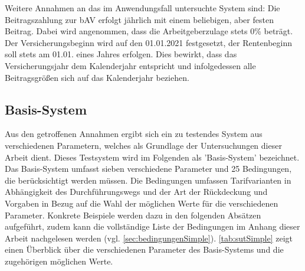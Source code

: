 Weitere Annahmen an das im Anwendungsfall untersuchte System sind: Die Beitragszahlung zur bAV erfolgt jährlich mit einem beliebigen, aber festen Beitrag. Dabei wird angenommen, dass die Arbeitgeberzulage stets 0\% beträgt. Der Versicherungsbeginn wird auf den 01.01.2021 festgesetzt, der Rentenbeginn soll stets am 01.01. eines Jahres erfolgen. Dies bewirkt, dass das Versicherungsjahr dem Kalenderjahr entspricht und infolgedessen alle Beitragsgrößen sich auf das Kalenderjahr beziehen.


\subsection{Basis-System}\label{subsec:ImplBasisModell}

Aus den getroffenen Annahmen ergibt sich ein zu testendes System aus verschiedenen Parametern, welches als Grundlage der Untersuchungen dieser Arbeit dient. Dieses Testsystem wird im Folgenden als 'Basis-System' bezeichnet. Das Basis-System umfasst sieben verschiedene Parameter und 25 Bedingungen, die berücksichtigt werden müssen. Die Bedingungen umfassen Tarifvarianten in Abhängigkeit des Durchführungswegs und der Art der Rückdeckung und Vorgaben in Bezug auf die Wahl der möglichen Werte für die verschiedenen Parameter. Konkrete Beispiele werden dazu in den folgenden Absätzen aufgeführt, zudem kann die vollständige Liste der Bedingungen im Anhang dieser Arbeit nachgelesen werden (vgl. \autoref{sec:bedingungenSimple}). \autoref{tab:sutSimple} zeigt einen Überblick über die verschiedenen Parameter des Basis-Systems und die zugehörigen möglichen Werte.

